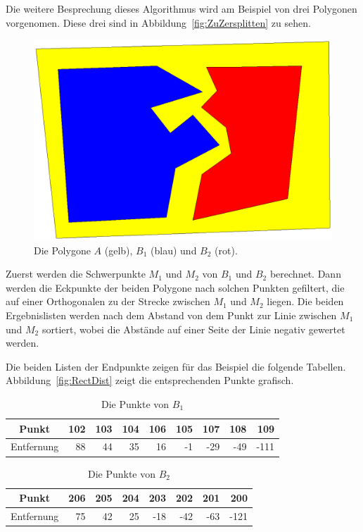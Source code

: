 Die weitere Besprechung dieses Algorithmus wird am Beispiel von drei Polygonen vorgenomen. Diese drei sind in Abbildung~\vref{fig:ZuZersplitten} zu sehen.

\begin{figure}
	\centering
	\includegraphics[scale=0.6]{ZuZersplitten.eps}
	\caption[Zu teilendes Polygon mit Referenzpolygonen]{Die Polygone $A$ (gelb), $B_1$ (blau) und $B_2$ (rot).}
	\label{fig:ZuZersplitten}
\end{figure}

Zuerst werden die Schwerpunkte $M_1$ und $M_2$  von $B_1$ und $B_2$ berechnet. Dann werden die Eckpunkte der beiden Polygone nach solchen Punkten gefiltert, die auf einer Orthogonalen zu der Strecke zwischen $M_1$ und $M_2$ liegen. Die beiden Ergebnislisten werden nach dem Abstand von dem Punkt zur Linie zwischen $M_1$ und $M_2$ sortiert, wobei die Abstände auf einer Seite der Linie negativ gewertet werden.

Die beiden Listen der Endpunkte zeigen für das Beispiel die folgende Tabellen. Abbildung~\vref{fig:RectDist} zeigt die entsprechenden Punkte grafisch.

\begin{table}[!h]
\begin{tabular}{|c|r|r|r|r|r|r|r|r|}
\hline
Punkt&
 102&
 103&
 104&
 106&
 105&
 107&
 108&
 109\\
\hline
Entfernung&
   88&
   44&
   35&
   16&
   -1&
  -29&
  -49&
 -111\\
\hline
\end{tabular} 
\caption{Die Punkte von $B_1$}
\end{table}
\begin{table}[!h]


\begin{tabular}{|c|r|r|r|r|r|r|r|}



\hline
Punkt&
 206&
 205&
 204&
 203&
 202&
 201&
 200
\\
\hline
Entfernung&
   75&
   42&
   25&
  -18&
  -42&
  -63&
 -121
\\
\hline
\end{tabular} 
\caption{Die Punkte von $B_2$}
\end{table}


